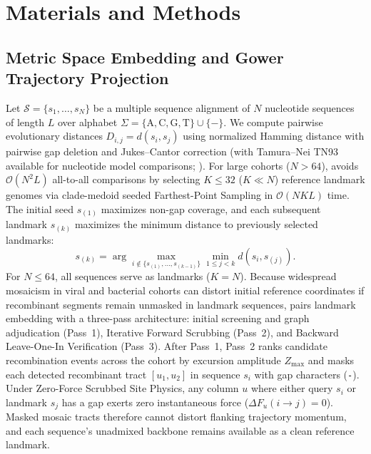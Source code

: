 \section{Materials and Methods}
\label{sec:methods}

\subsection{Metric Space Embedding and Gower Trajectory Projection}
\label{subsec:methods_embedding_gower}
Let $\mathcal{S} = \{s_1, \dots, s_N\}$ be a multiple sequence alignment of $N$ nucleotide sequences of length $L$ over alphabet $\Sigma = \{\text{A}, \text{C}, \text{G}, \text{T}\} \cup \{-\}$. We compute pairwise evolutionary distances $D_{i,j} = d(s_i, s_j)$ using normalized Hamming distance with pairwise gap deletion and Jukes--Cantor correction (with Tamura--Nei TN93 available for nucleotide model comparisons; \citealp{tamura1993estimation}). For large cohorts ($N > 64$), \RhizAeon avoids $\mathcal{O}(N^2 L)$ all-to-all comparisons by selecting $K \le 32$ ($K \ll N$) reference landmark genomes via clade-medoid seeded Farthest-Point Sampling \citep{gonzalez1985clustering} in $\mathcal{O}(N K L)$ time. The initial seed $s_{(1)}$ maximizes non-gap coverage, and each subsequent landmark $s_{(k)}$ maximizes the minimum distance to previously selected landmarks:
\begin{equation}
s_{(k)} = \arg\max_{i \notin \{s_{(1)},\dots,s_{(k-1)}\}} \min_{1 \le j < k} d(s_i, s_{(j)}).
\label{eq:methods_fps}
\end{equation}
For $N \le 64$, all sequences serve as landmarks ($K = N$). Because widespread mosaicism in viral and bacterial cohorts can distort initial reference coordinates if recombinant segments remain unmasked in landmark sequences, \RhizAeon pairs landmark embedding with a three-pass architecture: initial screening and graph adjudication (Pass~1), Iterative Forward Scrubbing (Pass~2), and Backward Leave-One-In Verification (Pass~3). After Pass~1, Pass~2 ranks candidate recombination events across the cohort by excursion amplitude $Z_{\max}$ and masks each detected recombinant tract $[u_1, u_2]$ in sequence $s_i$ with gap characters (\texttt{-}). Under Zero-Force Scrubbed Site Physics, any column $u$ where either query $s_i$ or landmark $s_j$ has a gap exerts zero instantaneous force ($\Delta F_u(i \to j) = 0$). Masked mosaic tracts therefore cannot distort flanking trajectory momentum, and each sequence's unadmixed backbone remains available as a clean reference landmark.

